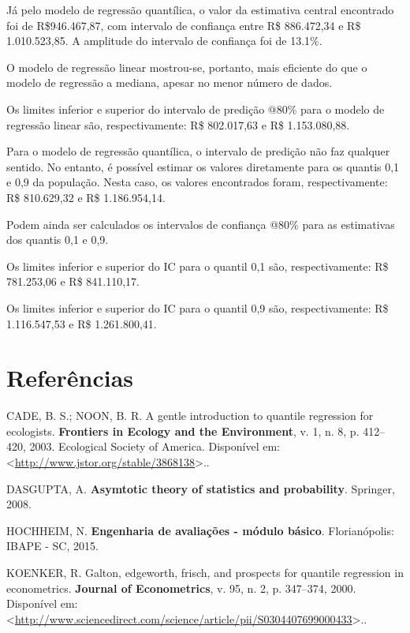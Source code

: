 \documentclass[a4paper, 12pt]{article}
\begin{document}
Já pelo modelo de regressão quantílica, o valor da estimativa central
encontrado foi de R\$946.467,87, com intervalo de confiança entre R\$
886.472,34 e R\$ 1.010.523,85. A amplitude do intervalo de confiança foi
de 13.1\%.

O modelo de regressão linear mostrou-se, portanto, mais eficiente do que
o modelo de regressão a mediana, apesar no menor número de dados.

Os limites inferior e superior do intervalo de predição @80\% para o
modelo de regressão linear são, respectivamente: R\$ 802.017,63 e R\$
1.153.080,88.

Para o modelo de regressão quantílica, o intervalo de predição não faz
qualquer sentido. No entanto, é possível estimar os valores diretamente
para os quantis 0,1 e 0,9 da população. Nesta caso, os valores
encontrados foram, respectivamente: R\$ 810.629,32 e R\$ 1.186.954,14.

Podem ainda ser calculados os intervalos de confiança @80\% para as
estimativas dos quantis 0,1 e 0,9.

Os limites inferior e superior do IC para o quantil 0,1 são,
respectivamente: R\$ 781.253,06 e R\$ 841.110,17.

Os limites inferior e superior do IC para o quantil 0,9 são,
respectivamente: R\$ 1.116.547,53 e R\$ 1.261.800,41.

\hypertarget{referencias}{%
\section*{Referências}\label{referencias}}

\hypertarget{refs}{}
\leavevmode\hypertarget{ref-QReco}{}%
CADE, B. S.; NOON, B. R. A gentle introduction to quantile regression
for ecologists. \textbf{Frontiers in Ecology and the Environment}, v. 1,
n. 8, p. 412--420, 2003. Ecological Society of America. Disponível em:
\textless{}\url{http://www.jstor.org/stable/3868138}\textgreater{}..

\leavevmode\hypertarget{ref-dasGupta}{}%
DASGUPTA, A. \textbf{Asymtotic theory of statistics and probability}.
Springer, 2008.

\leavevmode\hypertarget{ref-hochheim}{}%
HOCHHEIM, N. \textbf{Engenharia de avaliações - módulo básico}.
Florianópolis: IBAPE - SC, 2015.

\leavevmode\hypertarget{ref-koenker2000}{}%
KOENKER, R. Galton, edgeworth, frisch, and prospects for quantile
regression in econometrics. \textbf{Journal of Econometrics}, v. 95, n.
2, p. 347--374, 2000. Disponível em:
\textless{}\url{http://www.sciencedirect.com/science/article/pii/S0304407699000433}\textgreater{}..
\end{document}
